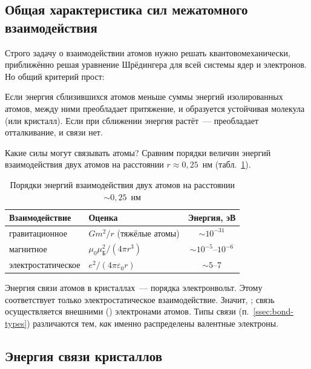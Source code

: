 \subsection{Общая характеристика сил межатомного взаимодействия}\label{ssec:forces}

Строго задачу о взаимодействии атомов нужно решать квантовомеханически,
приближённо решая уравнение Шрёдингера для всей системы ядер и
электронов. Но общий критерий прост:
\begin{glavnoe}
Если энергия сблизившихся атомов меньше суммы энергий изолированных
атомов, между ними преобладает притяжение, и образуется устойчивая
молекула (или кристалл). Если при сближении энергия растёт~—
преобладает отталкивание, и связи нет.
\end{glavnoe}

Какие силы могут связывать атомы? Сравним порядки величин энергий
взаимодействия двух атомов на расстоянии $r\approx0{,}25$~нм
(табл.~\ref{tab:forces}).

\begin{table}[ht]
\centering
\caption{Порядки энергий взаимодействия двух атомов на расстоянии $\sim0{,}25$~нм}
\label{tab:forces}
\small
\begin{tabular}{@{}llc@{}}
\toprule
Взаимодействие & Оценка & Энергия, эВ \\
\midrule
гравитационное & $Gm^2/r$ (тяжёлые атомы) & $\sim10^{-31}$ \\
магнитное & $\mu_0\mu_\text{Б}^2/(4\pi r^3)$ & $\sim10^{-5}$--$10^{-6}$ \\
электростатическое & $e^2/(4\pi\varepsilon_0r)$ & $\sim5$--$7$ \\
\bottomrule
\end{tabular}
\end{table}

Энергия связи атомов в кристаллах~— порядка электронвольт. Этому
соответствует только электростатическое взаимодействие. Значит,
; связь
осуществляется внешними () электронами атомов. Типы
связи (п.~\ref{ssec:bond-types}) различаются тем, \emph{как} именно
распределены валентные электроны.

\subsection{Энергия связи кристаллов}\label{ssec:binding}

